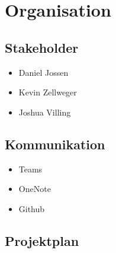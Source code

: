 \section{Organisation}

\subsection{Stakeholder}
\begin{itemize}
    \item Daniel Jossen
    \item Kevin Zellweger
    \item Joshua Villing
\end{itemize}
\subsection{Kommunikation}
\begin{itemize}
    \item Teams
    \item OneNote
    \item Github
\end{itemize}
\subsection{Projektplan}